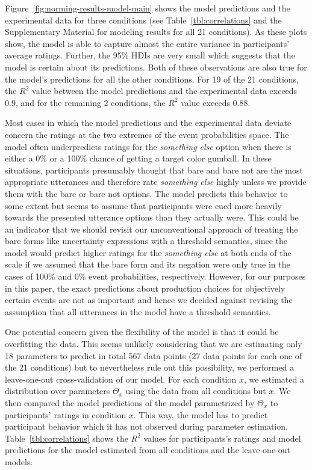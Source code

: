 \documentclass[lucida,biblatex]{sp} %
\begin{document}
Figure~\ref{fig:norming-results-model-main} shows the model predictions and the experimental data for three conditions 
(see Table~\ref{tbl:correlations} and the Supplementary Material for modeling results for all 21 conditions). As these plots show, the model
is able to capture almost the entire variance in participants' average ratings. Further, the 95\% HDIs are very small which suggests
that the model is certain about its predictions. Both of these observations are also true for the model's predictions for all the other
conditions. For 19 of the 21 conditions, the $R^2$ value between the model predictions and the experimental data exceeds 0.9,
and for the remaining 2 conditions, the $R^2$ value exceeds 0.88. 

Most cases in which the model predictions and the experimental data deviate concern the ratings at the two extremes of the event probabilities space.
The model often underpredicts ratings for the \textit{something else} option when there is either a 0\% or a 100\% chance of 
getting a target color gumball. In these situations, participants presumably thought that {\sc bare} and {\sc bare not} are the most appropriate
utterances and therefore rate \textit{something else} highly unless we provide them with the {\sc bare} or {\sc bare not} options. The model predicts
this behavior to some extent but seems to assume that participants were cued more heavily towards the presented utterance options than they actually were.
This could be an indicator that we should revisit our unconventional approach of treating the bare forms like uncertainty expressions with a threshold semantics,
since the model would predict higher ratings for the \textit{something else} at both ends of the scale if we assumed that the bare form and its negation were only true
in the cases of 100\% and 0\% event probabilities, respectively. 
However, for our purposes in this paper, the exact predictions about production choices for objectively certain events are not as important and hence
we decided against revising the assumption that all utterances in the model have a threshold semantics.


One potential concern given the flexibility of the model is that it could be overfitting the data. 
This seems unlikely considering that we are estimating only 18 parameters to predict in total 567 data points 
(27 data points for each one of the 21 conditions) but to nevertheless rule out this possibility, we performed a leave-one-out cross-validation of
our model. For each condition $x$, we estimated a distribution over parameters $\Theta_x$ using the data from all conditions but $x$. We then
compared the model predictions of the model parametrized by $\Theta_x$ to participants' ratings in condition $x$. This way, the model has to predict
participant behavior which it has not observed during parameter estimation. Table~\ref{tbl:correlations} shows the $R^2$ values for participants's
ratings and model predictions for the model estimated from all conditions and the leave-one-out models.
\end{document}
